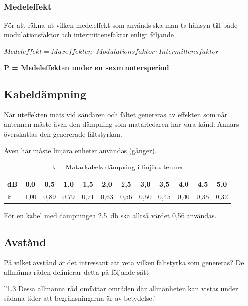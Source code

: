 \subsubsection{Medeleffekt}

För att räkna ut vilken medeleffekt som används ska man ta hänsyn
till både modulationsfaktor och intermittensfaktor enligt följande

\(\textit{Medeleffekt} = \textit{Maxeffekten} \cdot
\textit{Modulationsfaktor} \cdot
\textit{Intermittensfaktor}\)

\noindent\textbf{P = Medeleffekten under en sexminutersperiod}

\subsection{Kabeldämpning}

När uteffekten mäts vid sändaren och fältet genereras av effekten som når
antennen måste även den dämpning som matarledaren har vara känd.
Annars överskattas den genererade fältstyrkan.
 
Även här måste linjära enheter användas (gånger).

\begin{table}[ht]
  \begin{center}
    \begin{tabular}{|l|c|c|c|c|c|c|c|c|c|c|c|}
	\hline
	dB & 0,0  & 0,5  & 1,0  & 1,5  & 2,0  & 2,5  & 3,0  & 3,5  & 4,0  & 4,5  & 5,0 \\ \hline
	k  & 1,00 & 0,89 & 0,79 & 0,71 & 0,63 & 0,56 & 0,50 & 0,45 & 0,40 & 0,35 & 0,32 \\ \hline
    \end{tabular}
    \caption{k = Matarkabels dämpning i linjära termer}
    \label{tab:feedannut}
  \end{center}
\end{table}

För en kabel med dämpningen \qty{2,5}{\decibel} ska alltså värdet 0,56 användas.

\subsection{Avstånd}

På vilket avstånd är det intressant att veta vilken fältstyrka som genereras?
De allmänna råden definierar detta på följande sätt

”1.3  Dessa allmänna råd omfattar områden där allmänheten kan vistas under sådana tider att begränsningarna är av betydelse.”

